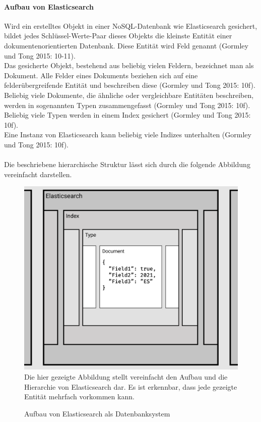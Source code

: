 \documentclass[a4paper]{scrartcl}
\begin{document}
\paragraph{Aufbau von Elasticsearch}
Wird ein erstelltes Objekt in einer NoSQL-Datenbank wie Elasticsearch gesichert, bildet jedes Schlüssel-Werte-Paar dieses Objekts die kleinste Entität einer dokumentenorientierten Datenbank. Diese Entität wird Feld genannt (Gormley und Tong 2015: 10-11). \\

Das gesicherte Objekt, bestehend aus beliebig vielen Feldern, bezeichnet man als Dokument. Alle Felder eines Dokuments beziehen sich auf eine felderübergreifende Entität und beschreiben diese (Gormley und Tong 2015: 10f). \\

Beliebig viele Dokumente, die ähnliche oder vergleichbare Entitäten beschreiben, werden in sogenannten Typen zusammengefasst (Gormley und Tong 2015: 10f). \\

Beliebig viele Typen werden in einem Index gesichert (Gormley und Tong 2015: 10f). \\

Eine Instanz von Elasticsearch kann beliebig viele Indizes unterhalten (Gormley und Tong 2015: 10f). \\ \\
Die beschriebene hierarchische Struktur lässt sich durch die folgende Abbildung vereinfacht darstellen.

\begin{figure}[h!]
	\centering
	\caption{Aufbau von Elasticsearch als Datenbanksystem}
	\includegraphics[scale=0.2]{assets/Elasticsearch_Structure} \\
	Die hier gezeigte Abbildung stellt vereinfacht den Aufbau und die Hierarchie von Elasticsearch dar. Es ist erkennbar, dass jede gezeigte Entität mehrfach vorkommen kann.
\end{figure}
   
\end{document}
